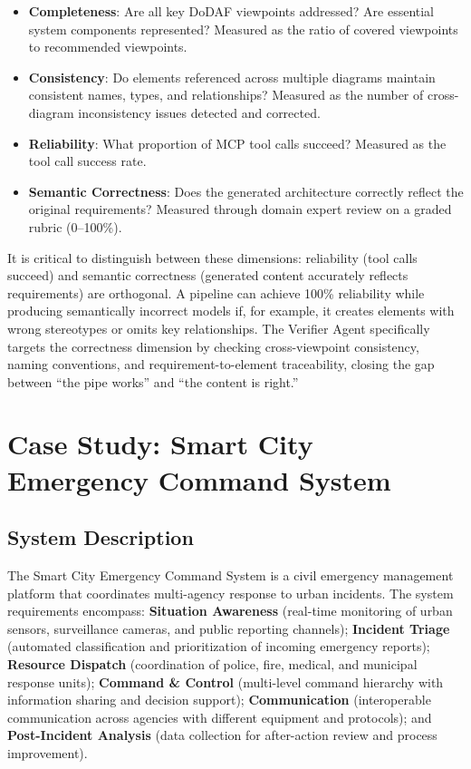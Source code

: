 \documentclass{ieeeaccess}
\begin{document}
\begin{itemize}
    \item \textbf{Completeness}: Are all key DoDAF viewpoints addressed? Are essential system components represented? Measured as the ratio of covered viewpoints to recommended viewpoints.
    \item \textbf{Consistency}: Do elements referenced across multiple diagrams maintain consistent names, types, and relationships? Measured as the number of cross-diagram inconsistency issues detected and corrected.
    \item \textbf{Reliability}: What proportion of MCP tool calls succeed? Measured as the tool call success rate.
    \item \textbf{Semantic Correctness}: Does the generated architecture correctly reflect the original requirements? Measured through domain expert review on a graded rubric (0--100\%).
\end{itemize}

It is critical to distinguish between these dimensions: reliability (tool calls succeed) and semantic correctness (generated content accurately reflects requirements) are orthogonal. A pipeline can achieve 100\% reliability while producing semantically incorrect models if, for example, it creates elements with wrong stereotypes or omits key relationships. The Verifier Agent specifically targets the correctness dimension by checking cross-viewpoint consistency, naming conventions, and requirement-to-element traceability, closing the gap between ``the pipe works'' and ``the content is right.''

\section{Case Study: Smart City Emergency Command System}
\label{sec:casestudy}

\subsection{System Description}

The Smart City Emergency Command System is a civil emergency management platform that coordinates multi-agency response to urban incidents. The system requirements encompass: \textbf{Situation Awareness} (real-time monitoring of urban sensors, surveillance cameras, and public reporting channels); \textbf{Incident Triage} (automated classification and prioritization of incoming emergency reports); \textbf{Resource Dispatch} (coordination of police, fire, medical, and municipal response units); \textbf{Command \& Control} (multi-level command hierarchy with information sharing and decision support); \textbf{Communication} (interoperable communication across agencies with different equipment and protocols); and \textbf{Post-Incident Analysis} (data collection for after-action review and process improvement).
\end{document}
